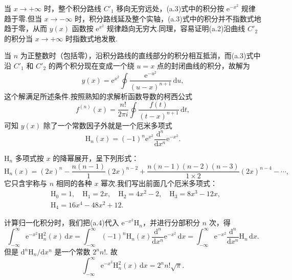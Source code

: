 当 $x\to+\infty$ 时，整个积分路线 $C'_1$ 移向无穷远处，(a.3)式中的积分按 $\mathrm{e}^{-x^2}$ 规律趋于零.但当 $x\to-\infty$ 时，积分路线延及整个实轴，(a.3)式中的积分并不指数式地趋于零，从而 $y(x)$ 函数按 $\mathrm{e}^{x^2}$ 规律趋向无穷大.同理，容易证明(a.2)沿曲线 $C'_2$ 的积分当 $x\to+\infty$ 时指数式地发散.

当 $n$ 为正整数时（包括零），沿积分路线的直线部分的积分相互抵消，而(a.3)式中沿 $C'_1$ 和 $C'_2$ 的两个积分现在变成一个绕 $u=x$ 点的封闭曲线的积分，故解为
\begin{equation*}
  y(x)=\mathrm{e}^{x^2}\oint\frac{\mathrm{e}^{-u^2}}{(u-x)^{n+1}}\,\mathrm{d}u,
\end{equation*}
这个解满足所述条件.按照熟知的求解析函数导数的柯西公式
\begin{equation*}
  f^{(n)}(x)=\frac{n!}{2\pi i}\oint\frac{f(t)}{(t-x)^{n+1}}\,\mathrm{d}t,
\end{equation*}
可知 $y(x)$ 除了一个常数因子外就是一个厄米多项式
\begin{equation}
  \mathrm{H}_n(x)=(-1)^n\mathrm{e}^{x^2}\frac{\mathrm{d}^n}{\mathrm{d}x^n}\mathrm{e}^{-x^2}.
\end{equation}

$\mathrm{H}_n$ 多项式按 $x$ 的降幂展开，呈下列形式：
\begin{equation}
  \mathrm{H}_n(x)=(2x)^n-\frac{n(n-1)}{1}(2x)^{n-2}
  +\frac{n(n-1)(n-2)(n-3)}{1\times2}(2x)^{n-4}-\cdots,
\end{equation}
它只含宇称与 $n$ 相同的各种 $x$ 幂次.我们写出前面几个厄米多项式：
\begin{equation}
\begin{aligned}
  &\mathrm{H}_0=1,\quad \mathrm{H}_1=2x,\quad
  \mathrm{H}_2=4x^2-2,\quad \mathrm{H}_3=8x^3-12x,\\
  &\mathrm{H}_4=16x^4-48x^2+12.
\end{aligned}
\end{equation}

计算归一化积分时，我们把(a.4)代入 $\mathrm{e}^{-x^2}\mathrm{H}_n$，并进行分部积分 $n$ 次，得
\begin{equation*}
  \int_{-\infty}^{\infty}\mathrm{e}^{-x^2}\mathrm{H}_n^2(x)\,\mathrm{d}x
  =\int_{-\infty}^{\infty}(-1)^n\mathrm{H}_n(x)
  \frac{\mathrm{d}^n}{\mathrm{d}x^n}\mathrm{e}^{-x^2}\,\mathrm{d}x
  =\int_{-\infty}^{\infty}\mathrm{e}^{-x^2}
  \frac{\mathrm{d}^n}{\mathrm{d}x^n}\mathrm{H}_n\,\mathrm{d}x.
\end{equation*}
但是 $\mathrm{d}^n\mathrm{H}_n/\mathrm{d}x^n$ 是一个常数 $2^nn!$. 故
\begin{equation}
  \int_{-\infty}^{\infty}\mathrm{e}^{-x^2}\mathrm{H}_n^2(x)\,\mathrm{d}x=2^nn!\sqrt{\pi}.
\end{equation}

